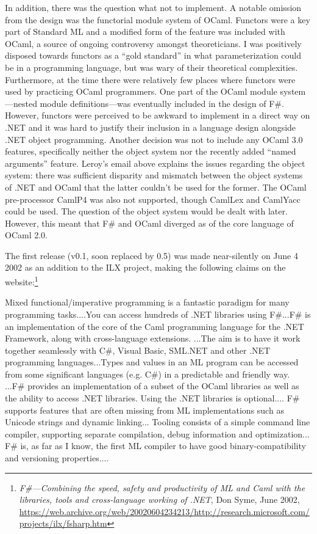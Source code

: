 \documentclass[acmsmall]{acmart}\settopmatter{}
\begin{document}
In addition, there was the question what not to implement.  A notable omission from the design was the functorial module system of
OCaml.  Functors were a key part of Standard ML and a modified form of the feature was included with OCaml, a source of ongoing
controversy amongst theoreticians.  I was positively disposed towards functors as a “gold standard” in what parameterization could
be in a programming language, but was wary of their theoretical complexities. Furthermore, at the time there were relatively few places
where functors were used by practicing OCaml programmers. One part of the OCaml module system---nested module definitions---was
eventually included in the design of F\#.  However, functors were perceived to be awkward to implement in a direct way on .NET and it
was hard to justify their inclusion in a language design alongside .NET object programming. Another decision was not to include any
OCaml 3.0 features, specifically neither the object system nor the recently added “named arguments” feature.  Leroy’s email above explains
the issues regarding the object system: there was sufficient disparity and mismatch between the object systems of .NET and OCaml that
the latter couldn’t be used for the former.  The OCaml pre-processor CamlP4 was also not supported, though CamlLex and CamlYacc could
be used. The question of the object system would be dealt with later.  However, this meant that F\# and OCaml diverged as of the core language of OCaml 2.0.


The first release (v0.1, soon replaced by 0.5) was made near-silently on June 4 2002 as an addition to the ILX project, making the following claims on the website:\footnote{\textit{F\#---Combining the speed, safety and productivity of ML and Caml with the libraries, tools and cross-language working of .NET}, Don Syme, June 2002, \url{https://web.archive.org/web/20020604234213/http://research.microsoft.com/projects/ilx/fsharp.htm}}
\begin{verbquote}
Mixed functional/imperative programming is a fantastic paradigm for many programming tasks....You can access hundreds of .NET libraries using F#...F# is an implementation of the core of the Caml programming language for the .NET Framework, along with cross-language extensions. ...The aim is to have it work together seamlessly with C#, Visual Basic, SML.NET and other .NET programming languages...Types and values in an ML program can be accessed from some significant languages (e.g. C#) in a predictable and friendly way. ...F# provides an implementation of a subset of the OCaml libraries as well as the ability to access .NET libraries.  Using the .NET libraries is optional.... F# supports features that are often missing from ML implementations such as Unicode strings and dynamic linking... Tooling consists of a simple command line compiler, supporting separate compilation, debug information and optimization... F# is, as far as I know, the first ML compiler to have good binary-compatibility and versioning properties....
\end{verbquote}
\end{document}
